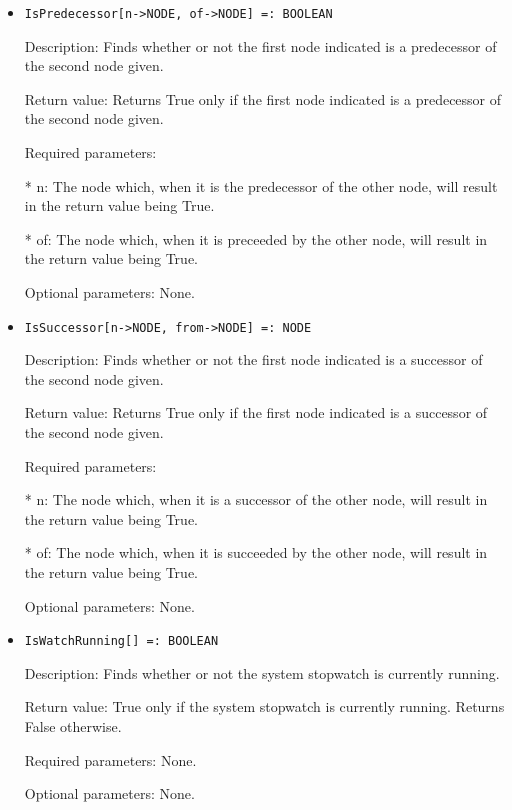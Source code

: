 \begin{itemize}
\item
\begin{verbatim}
IsPredecessor[n->NODE, of->NODE] =: BOOLEAN
\end{verbatim}

\bd
\item
[Description:] Finds whether or not the first node indicated is a 
predecessor of the second node given.
\item
[Return value:] Returns True only if the first node indicated is a
predecessor of the second node given.
\item
[Required parameters:]\hfil\null

\bd
\item
[* n:] The node which, when it is the predecessor of the other node,
will result in the return value being True.
\item
[* of:] The node which, when it is preceeded by the other node, will
result in the return value being True.
\ed

\item
[Optional parameters:] None.
\ed

\item
\begin{verbatim}
IsSuccessor[n->NODE, from->NODE] =: NODE
\end{verbatim}

\bd
\item
[Description:] Finds whether or not the first node indicated is a 
successor of the second node given.
\item
[Return value:] Returns True only if the first node indicated is a successor of the second node given.
\item
[Required parameters:]\hfil\null
	
\bd
\item
[* n:] The node which, when it is a successor of the other node, will
result in the return value being True.
\item
[* of:] The node which, when it is succeeded by the other node, will
result in the return value being True.
\ed

\item
[Optional parameters:] None.
\ed

\item
\begin{verbatim}
IsWatchRunning[] =: BOOLEAN
\end{verbatim}

\bd
\item
[Description:] Finds whether or not the system stopwatch is currently
running.
\item
[Return value:] True only if the system stopwatch is currently running.
Returns False otherwise.
\item
[Required parameters:] None.
\item
[Optional parameters:] None.
\ed


\end{itemize}
